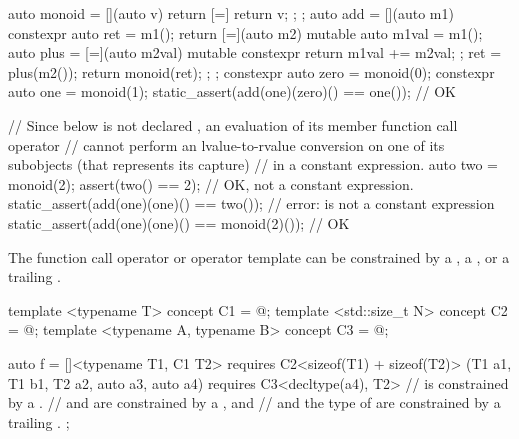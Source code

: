 \pnum
\begin{example}
\begin{codeblock}
auto monoid = [](auto v) { return [=] { return v; }; };
auto add = [](auto m1) constexpr {
  auto ret = m1();
  return [=](auto m2) mutable {
    auto m1val = m1();
    auto plus = [=](auto m2val) mutable constexpr
                   { return m1val += m2val; };
    ret = plus(m2());
    return monoid(ret);
  };
};
constexpr auto zero = monoid(0);
constexpr auto one = monoid(1);
static_assert(add(one)(zero)() == one());       // OK

// Since  below is not declared , an evaluation of its  member function call operator
// cannot perform an lvalue-to-rvalue conversion on one of its subobjects (that represents its capture)
// in a constant expression.
auto two = monoid(2);
assert(two() == 2); // OK, not a constant expression.
static_assert(add(one)(one)() == two());        // error:  is not a constant expression
static_assert(add(one)(one)() == monoid(2)());  // OK
\end{codeblock}
\end{example}

\pnum
\begin{note}
The function call operator or operator template can be constrained
by a ,
a ,
or a trailing .
\begin{example}
\begin{codeblock}
template <typename T> concept C1 = @\commentellip@;
template <std::size_t N> concept C2 = @\commentellip@;
template <typename A, typename B> concept C3 = @\commentellip@;

auto f = []<typename T1, C1 T2> requires C2<sizeof(T1) + sizeof(T2)>
         (T1 a1, T1 b1, T2 a2, auto a3, auto a4) requires C3<decltype(a4), T2> {
  //  is constrained by a .
  //  and  are constrained by a , and
  //  and the type of  are constrained by a trailing .
};
\end{codeblock}
\end{example}
\end{note}

